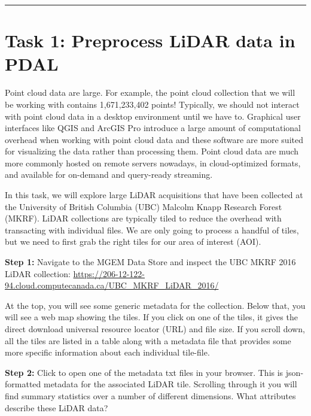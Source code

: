 \documentclass[
]{book}
\begin{document}
\begin{center}\rule{0.5\linewidth}{0.5pt}\end{center}

\hypertarget{task-1-preprocess-lidar-data-in-pdal}{%
\section*{Task 1: Preprocess LiDAR data in PDAL}\label{task-1-preprocess-lidar-data-in-pdal}}

Point cloud data are large. For example, the point cloud collection that we will be working with contains 1,671,233,402 points! Typically, we should not interact with point cloud data in a desktop environment until we have to. Graphical user interfaces like QGIS and ArcGIS Pro introduce a large amount of computational overhead when working with point cloud data and these software are more suited for visualizing the data rather than processing them. Point cloud data are much more commonly hosted on remote servers nowadays, in cloud-optimized formats, and available for on-demand and query-ready streaming.

In this task, we will explore large LiDAR acquisitions that have been collected at the University of British Columbia (UBC) Malcolm Knapp Research Forest (MKRF). LiDAR collections are typically tiled to reduce the overhead with transacting with individual files. We are only going to process a handful of tiles, but we need to first grab the right tiles for our area of interest (AOI).

\textbf{Step 1:} Navigate to the MGEM Data Store and inspect the UBC MKRF 2016 LiDAR collection: \url{https://206-12-122-94.cloud.computecanada.ca/UBC_MKRF_LiDAR_2016/}

At the top, you will see some generic metadata for the collection. Below that, you will see a web map showing the tiles. If you click on one of the tiles, it gives the direct download universal resource locator (URL) and file size. If you scroll down, all the tiles are listed in a table along with a metadata file that provides some more specific information about each individual tile-file.

\textbf{Step 2:} Click to open one of the metadata txt files in your browser. This is json-formatted metadata for the associated LiDAR tile. Scrolling through it you will find summary statistics over a number of different dimensions. What attributes describe these LiDAR data?
\end{document}
